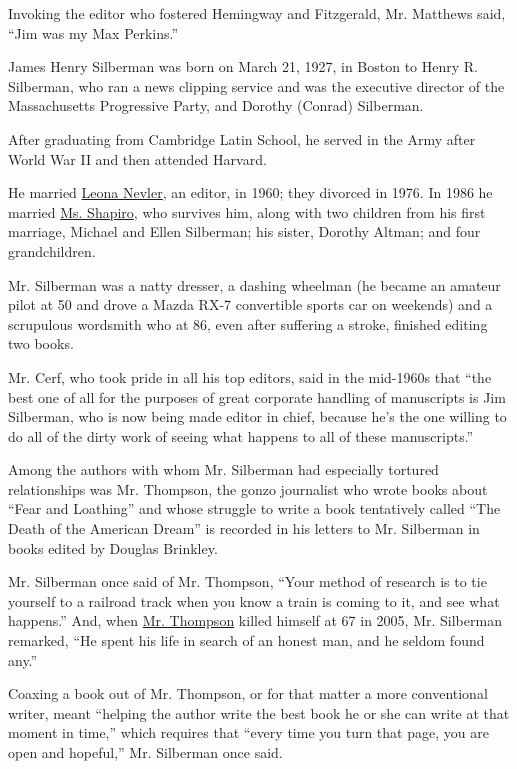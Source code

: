 Invoking the editor who fostered Hemingway and Fitzgerald, Mr. Matthews
said, ``Jim was my Max Perkins.''

James Henry Silberman was born on March 21, 1927, in Boston to Henry R.
Silberman, who ran a news clipping service and was the executive
director of the Massachusetts Progressive Party, and Dorothy (Conrad)
Silberman.

After graduating from Cambridge Latin School, he served in the Army
after World War II and then attended Harvard.

He married
\href{https://www.nytimes3xbfgragh.onion/2005/12/15/arts/leona-nevler-editor-dies-at-79-shepherded-peyton-place.html}{Leona
Nevler}, an editor, in 1960; they divorced in 1976. In 1986 he married
\href{https://www.nytimes3xbfgragh.onion/1986/08/27/style/selma-shapiro-wed-to-james-silberman.html}{Ms.
Shapiro}, who survives him, along with two children from his first
marriage, Michael and Ellen Silberman; his sister, Dorothy Altman; and
four grandchildren.

Mr. Silberman was a natty dresser, a dashing wheelman (he became an
amateur pilot at 50 and drove a Mazda RX-7 convertible sports car on
weekends) and a scrupulous wordsmith who at 86, even after suffering a
stroke, finished editing two books.

Mr. Cerf, who took pride in all his top editors, said in the mid-1960s
that ``the best one of all for the purposes of great corporate handling
of manuscripts is Jim Silberman, who is now being made editor in chief,
because he's the one willing to do all of the dirty work of seeing what
happens to all of these manuscripts.''

Among the authors with whom Mr. Silberman had especially tortured
relationships was Mr. Thompson, the gonzo journalist who wrote books
about ``Fear and Loathing'' and whose struggle to write a book
tentatively called ``The Death of the American Dream'' is recorded in
his letters to Mr. Silberman in books edited by Douglas Brinkley.

Mr. Silberman once said of Mr. Thompson, ``Your method of research is to
tie yourself to a railroad track when you know a train is coming to it,
and see what happens.'' And, when
\href{https://www.nytimes3xbfgragh.onion/2005/02/21/books/hunter-s-thompson-67-author-commits-suicide.html}{Mr.
Thompson} killed himself at 67 in 2005, Mr. Silberman remarked, ``He
spent his life in search of an honest man, and he seldom found any.''

Coaxing a book out of Mr. Thompson, or for that matter a more
conventional writer, meant ``helping the author write the best book he
or she can write at that moment in time,'' which requires that ``every
time you turn that page, you are open and hopeful,'' Mr. Silberman once
said.

